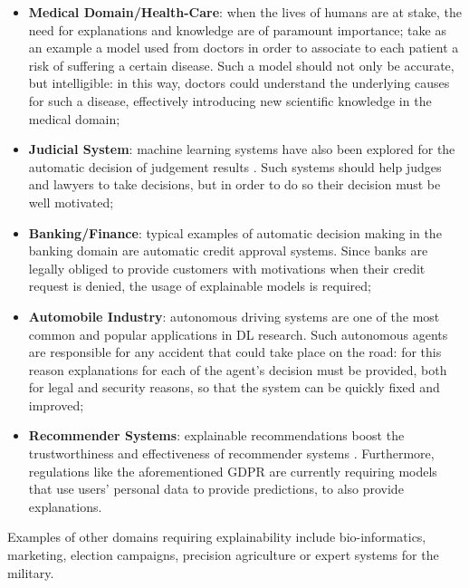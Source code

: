 \begin{itemize}
	\item \textbf{Medical Domain/Health-Care}: when the lives of humans are at stake, the need for explanations and knowledge are of paramount importance; take as an example a model used from doctors in order to associate to each patient a risk of suffering a certain disease. Such a model should not only be accurate, but intelligible: in this way, doctors could understand the underlying causes for such a disease, effectively introducing new scientific knowledge in the medical domain;
	\item \textbf{Judicial System}: machine learning systems have also been explored for the automatic decision of judgement results \cite{chen2019judicial}. Such systems should help judges and lawyers to take decisions, but in order to do so their decision must be well motivated;
	\item \textbf{Banking/Finance}: typical examples of automatic decision making in the banking domain are automatic credit approval systems. Since banks are legally obliged to provide customers with motivations when their credit request is denied, the usage of explainable models is required;
	\item \textbf{Automobile Industry}: autonomous driving systems are one of the most common and popular applications in DL research. Such autonomous agents are responsible for any accident that could take place on the road: for this reason explanations for each of the agent's decision must be provided, both for legal and security reasons, so that the system can be quickly fixed and improved;
	\item \textbf{Recommender Systems}: explainable recommendations boost the trustworthiness and effectiveness of recommender systems \cite{zhang2018explainable}. Furthermore, regulations like the aforementioned GDPR are currently requiring models that use users' personal data to provide predictions, to also provide explanations.
\end{itemize}
Examples of other domains requiring explainability include bio-informatics, marketing, election campaigns, precision agriculture or expert systems for the military.
